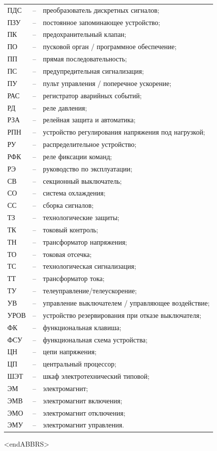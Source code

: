 \begin{longtable}{>{\raggedright\arraybackslash}m{2cm}>{\raggedright\arraybackslash}m{0.5cm}>{\raggedright\arraybackslash}m{20cm}}
ПДС & -- & преобразователь дискретных сигналов; \\
ПЗУ & -- & постоянное запоминающее устройство; \\
ПК & -- & предохранительный клапан; \\
ПО & -- & пусковой орган / программное обеспечение; \\
ПП & -- & прямая последовательность; \\
ПС & -- & предупредительная сигнализация; \\
ПУ & -- & пульт управления / поперечное ускорение; \\
РАС & -- & регистратор аварийных событий; \\
РД & -- & реле давления; \\
РЗА & -- & релейная защита и автоматика; \\
РПН & -- & устройство регулирования напряжения под нагрузкой; \\
РУ & -- & распределительное устройство; \\
РФК & -- & реле фиксации команд; \\
РЭ & -- & руководство по эксплуатации; \\
СВ & -- & секционный выключатель; \\
СО & -- & система охлаждения; \\
СС & -- & сборка сигналов; \\
ТЗ & -- & технологические защиты; \\
ТК & -- & токовый контроль; \\
ТН & -- & трансформатор напряжения; \\
ТО & -- & токовая отсечка; \\
ТС & -- & технологическая сигнализация; \\
ТТ & -- & трансформатор тока; \\
ТУ & -- & телеуправление/телеускорение; \\
УВ & -- & управление выключателем / управляющее воздействие; \\
УРОВ & -- & устройство резервирования при отказе выключателя; \\
ФК & -- & функциональная клавиша; \\
ФСУ & -- & функциональная схема устройства; \\
ЦН & -- & цепи напряжения; \\
ЦП & -- & центральный процессор; \\
ШЭТ & -- & шкаф электротехнический типовой; \\
ЭМ & -- & электромагнит; \\
ЭМВ & -- & электромагнит включения; \\
ЭМО & -- & электромагнит отключения; \\
ЭМУ & -- & электромагнит управления. \\
\end{longtable}
{\color{white}\fontsize{0.1pt}{0.1pt}\selectfont<endABBRS>}